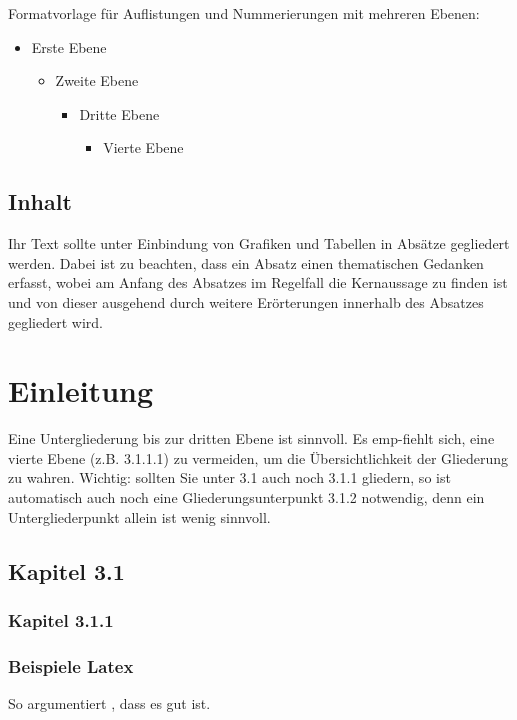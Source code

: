 \documentclass[12pt, oneside]{article}
\begin{document}
Formatvorlage für Auflistungen und Nummerierungen mit mehreren Ebenen:
\begin{itemize}
    \item Erste Ebene
    \begin{itemize}
        \item Zweite Ebene
        \begin{itemize}
            \item Dritte Ebene
            \begin{itemize}
                \item Vierte Ebene
            \end{itemize}
        \end{itemize}
    \end{itemize}
\end{itemize}


\subsection{Inhalt}
Ihr Text sollte unter Einbindung von Grafiken und Tabellen in Absätze gegliedert werden. Dabei ist zu beachten, dass ein Absatz einen thematischen Gedanken erfasst, wobei am Anfang des Absatzes im Regelfall die Kernaussage zu finden ist und von dieser ausgehend durch weitere Erörterungen innerhalb des Absatzes gegliedert wird. 

\newpage

\section{Einleitung} \label{sec:einleitung}

Eine Untergliederung bis zur dritten Ebene ist sinnvoll. Es emp-fiehlt sich, eine vierte Ebene (z.B. 3.1.1.1) zu vermeiden, um die Übersichtlichkeit der Gliederung zu wahren. Wichtig: sollten Sie unter 3.1 auch noch 3.1.1 gliedern, so ist automatisch auch noch eine Gliederungsunterpunkt 3.1.2 notwendig, denn ein Untergliederpunkt allein ist wenig sinnvoll.

\subsection{Kapitel 3.1}

\subsubsection{Kapitel 3.1.1}

\subsubsection{Beispiele Latex}
So argumentiert \citet{clemen1989combining, gilabert2006intelligent}, dass es gut ist.
\end{document}
